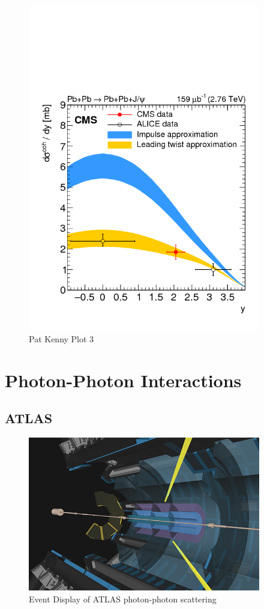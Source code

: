 \begin{figure}[h!]
\begin{centering}
\includegraphics[width=4in]{Chapter2/importfigs/patkenny_Figure_002.png}
\par\end{centering}
\caption{Pat Kenny Plot 3 \label{fig:pk3}}
\end{figure}


\section{Photon-Photon Interactions}

\subsection{ATLAS}

\begin{figure}[h!]
\begin{centering}
\includegraphics[width=4in]{Chapter2/importfigs/gammaGammaAtlasEvent.jpeg}
\par\end{centering}
\caption{Event Display of ATLAS photon-photon scattering \label{fig:atlasEvent}}
\end{figure}

